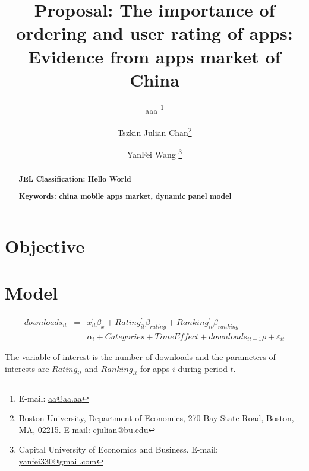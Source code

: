 \documentclass[11pt,twoside]{article}
\title{Proposal: The importance of ordering and user rating of apps: Evidence from apps market of China }
\author { 
	aaa \footnote{E-mail:  \protect\url{aa@aa.aa}} 
	\and Tszkin Julian Chan\footnote{Boston University, Department of Economics, 270 Bay State Road, Boston, MA, 02215. E-mail: \protect\url{cjulian@bu.edu}} 
	\and YanFei Wang \footnote{ Capital University of Economics and Business. E-mail: \protect\url{yanfei330@gmail.com}} 
}
\begin{document}
\maketitle
\begin{abstract}
\noindent \textbf{JEL Classification: Hello World} 

\noindent \textbf{Keywords: china mobile apps market, dynamic panel model }  

\end{abstract}
\newpage


\section{Objective}


\section{Model}

\begin{eqnarray} \label{eq:basic_eq}
	downloads_{it} &=& x_{it}^{'} \beta_{x} + Rating_{it}^{'} \beta_{rating} + Ranking_{it}^{'} \beta_{ranking} + \\
	&& \alpha_i + Categories + TimeEffect +  downloads_{it-1} \rho + \varepsilon_{it}
\end{eqnarray}
	
	The variable of interest is the number of downloads and the parameters of interests are $Rating_{it}$ and $Ranking_{it}$ for apps $i$ during period $t$. 
\end{document}
